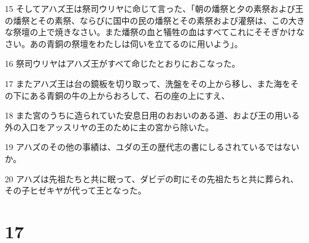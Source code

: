 \par 15 そしてアハズ王は祭司ウリヤに命じて言った、「朝の燔祭と夕の素祭および王の燔祭とその素祭、ならびに国中の民の燔祭とその素祭および灌祭は、この大きな祭壇の上で焼きなさい。また燔祭の血と犠牲の血はすべてこれにそそぎかけなさい。あの青銅の祭壇をわたしは伺いを立てるのに用いよう」。
\par 16 祭司ウリヤはアハズ王がすべて命じたとおりにおこなった。
\par 17 またアハズ王は台の鏡板を切り取って、洗盤をその上から移し、また海をその下にある青銅の牛の上からおろして、石の座の上にすえ、
\par 18 また宮のうちに造られていた安息日用のおおいのある道、および王の用いる外の入口をアッスリヤの王のために主の宮から除いた。
\par 19 アハズのその他の事績は、ユダの王の歴代志の書にしるされているではないか。
\par 20 アハズは先祖たちと共に眠って、ダビデの町にその先祖たちと共に葬られ、その子ヒゼキヤが代って王となった。

\chapter{17}

